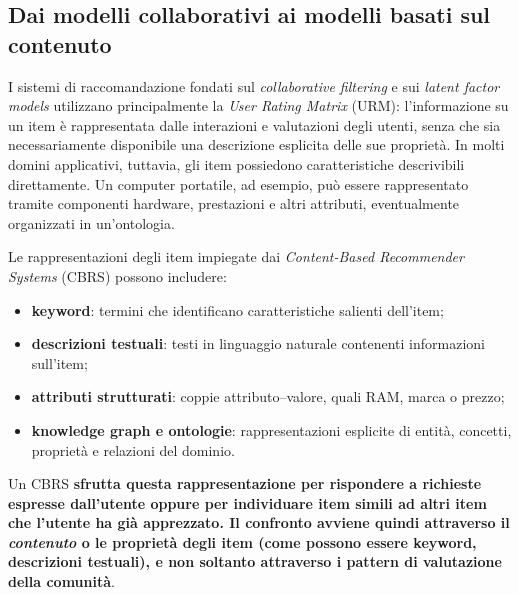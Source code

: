 \subsection{Dai modelli collaborativi ai modelli basati sul contenuto}

I sistemi di raccomandazione fondati sul \emph{collaborative filtering} e sui \emph{latent factor models} utilizzano principalmente la \emph{User Rating Matrix} (URM): l'informazione su un item è rappresentata dalle interazioni e valutazioni degli utenti, senza che sia necessariamente disponibile una descrizione esplicita delle sue proprietà. In molti domini applicativi, tuttavia, gli item possiedono caratteristiche descrivibili direttamente. Un computer portatile, ad esempio, può essere rappresentato tramite componenti hardware, prestazioni e altri attributi, eventualmente organizzati in un'ontologia.

Le rappresentazioni degli item impiegate dai \emph{Content-Based Recommender Systems} (CBRS) possono includere:
\begin{itemize}
    \item \textbf{keyword}: termini che identificano caratteristiche salienti dell'item;
    \item \textbf{descrizioni testuali}: testi in linguaggio naturale contenenti informazioni sull'item;
    \item \textbf{attributi strutturati}: coppie attributo--valore, quali RAM, marca o prezzo;
    \item \textbf{knowledge graph e ontologie}: rappresentazioni esplicite di entità, concetti, proprietà e relazioni del dominio.
\end{itemize}
Un CBRS \textbf{sfrutta questa rappresentazione per rispondere a richieste espresse dall'utente oppure per individuare item simili ad altri item che l'utente ha già apprezzato. Il confronto avviene quindi attraverso il \emph{contenuto} o le proprietà degli item (come possono essere keyword, descrizioni testuali), e non soltanto attraverso i pattern di valutazione della comunità}.

